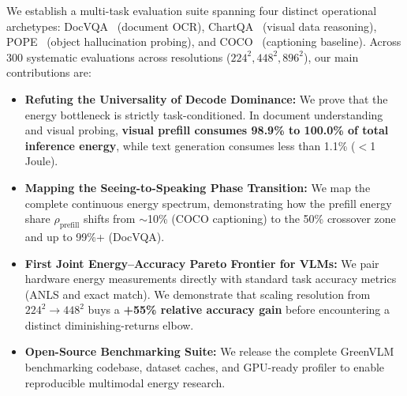 We establish a multi-task evaluation suite spanning four distinct operational archetypes: DocVQA~\cite{mathew2021docvqa} (document OCR), ChartQA~\cite{masry2022chartqa} (visual data reasoning), POPE~\cite{li2023evaluating} (object hallucination probing), and COCO~\cite{lin2014microsoft} (captioning baseline). Across 300 systematic evaluations across resolutions ($224^2, 448^2, 896^2$), our main contributions are:

\begin{itemize}[leftmargin=*]
    \item \textbf{Refuting the Universality of Decode Dominance:} We prove that the energy bottleneck is strictly task-conditioned. In document understanding and visual probing, \textbf{visual prefill consumes 98.9\% to 100.0\% of total inference energy}, while text generation consumes less than 1.1\% ($<$1 Joule).
    \item \textbf{Mapping the Seeing-to-Speaking Phase Transition:} We map the complete continuous energy spectrum, demonstrating how the prefill energy share $\rho_{\text{prefill}}$ shifts from $\sim$10\% (COCO captioning) to the 50\% crossover zone and up to 99\%+ (DocVQA).
    \item \textbf{First Joint Energy--Accuracy Pareto Frontier for VLMs:} We pair hardware energy measurements directly with standard task accuracy metrics (ANLS and exact match). We demonstrate that scaling resolution from $224^2 \to 448^2$ buys a \textbf{+55\% relative accuracy gain} before encountering a distinct diminishing-returns elbow.
    \item \textbf{Open-Source Benchmarking Suite:} We release the complete GreenVLM benchmarking codebase, dataset caches, and GPU-ready profiler to enable reproducible multimodal energy research.
\end{itemize}
